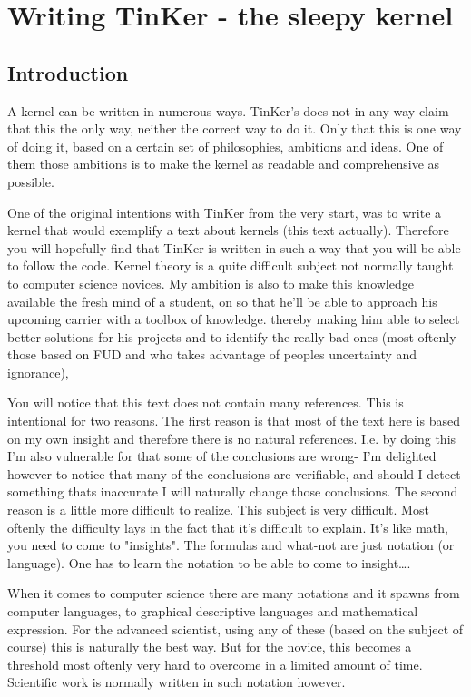 \part{Writing TinKer - the sleepy kernel}
\chapter{Introduction}
A kernel can be written in numerous ways. TinKer's does not in any way claim that this the only way, neither the correct way to do it. Only that this is one way of doing it, based on a certain set of philosophies, ambitions and ideas. One of them those ambitions is to make the kernel as readable and comprehensive as possible.

One of the original intentions with TinKer from the very start, was to write a kernel that would exemplify a text about kernels (this text actually). Therefore you will hopefully find that TinKer is written in such a way that you will be able to follow the code. Kernel theory is a quite difficult subject not normally taught to computer science novices. My ambition is also to make this knowledge available the fresh mind of a student, on so that he'll be able to approach his upcoming carrier with a toolbox of knowledge. thereby making him able to select better solutions for his projects and to identify the really bad ones (most oftenly those based on FUD and who takes advantage of peoples uncertainty and ignorance),

You will notice that this text does not contain many references. This is intentional for two reasons. The first reason is that most of the text here is based on my own insight and therefore there is no natural references. I.e. by doing this I'm also vulnerable for that some of the conclusions are wrong- I'm delighted however to notice that many of the conclusions are verifiable, and should I detect something thats inaccurate I will naturally change those conclusions.  The second reason is a little more difficult to realize. This subject is very difficult. Most oftenly the difficulty lays in the fact that it's difficult to explain. It's like math, you need to come to "insights". The formulas and what-not are just notation (or language). One has to learn the notation to be able to come to insight\ldots.

When it comes to computer science there are many notations and it spawns from computer languages, to graphical descriptive languages and mathematical expression. For the advanced scientist, using any of these (based on the subject of course) this is naturally the best way. But for the novice, this becomes a threshold most oftenly very hard to overcome in a limited amount of time. Scientific work is normally written in such notation however.

